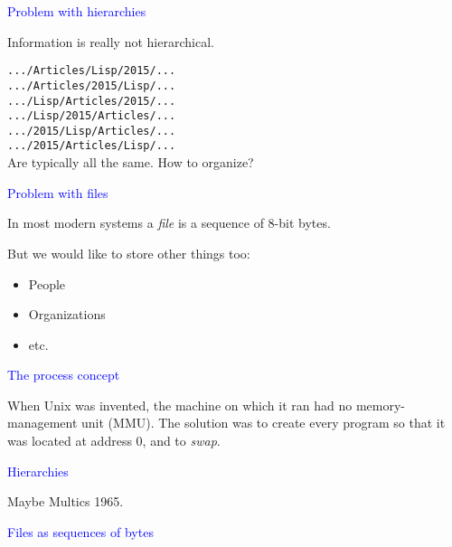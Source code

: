 \documentclass{slides}
\newcommand{\ti}[1]{\begin{center}\Large{\textcolor{blue}{#1}}\end{center}}
\begin{document}
\begin{slide}\ti{Problem with hierarchies}
\vskip 0.5cm
Information is really not hierarchical. 

\texttt{.../Articles/Lisp/2015/...}\\
\texttt{.../Articles/2015/Lisp/...}\\
\texttt{.../Lisp/Articles/2015/...}\\
\texttt{.../Lisp/2015/Articles/...}\\
\texttt{.../2015/Lisp/Articles/...}\\
\texttt{.../2015/Articles/Lisp/...}\\

Are typically all the same.  How to organize?

\vfill\end{slide}
\begin{slide}\ti{Problem with files}
\vskip 0.5cm
In most modern systems a \emph{file} is a sequence of 8-bit bytes.

But we would like to store other things too:

\begin{itemize}
\item People
\item Organizations
\item etc.
\end{itemize}

\vfill\end{slide}
\begin{slide}\ti{The process concept}

When Unix was invented, the machine on which it ran had no
memory-management unit (MMU).  The solution was to create every
program so that it was located at address 0, and to \emph{swap}.

\vfill\end{slide}
\begin{slide}\ti{Hierarchies}

Maybe Multics 1965.

\vfill\end{slide}
\begin{slide}\ti{Files as sequences of bytes}

\vfill\end{slide}
\end{document}
